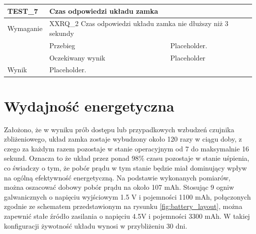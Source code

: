 \begin{table}[h!]
\begin{subtable}[c]{\textwidth}
                \centering
                    \begin{tabular}{|p{2cm}|p{}|p{}|}
                    \hline
                    TEST\_7               & \multicolumn{2}{l|}{\textbf{Czas odpowiedzi układu zamka}}                                                            \\ \hline
                    \cellcolor[gray]{0.8} Wymaganie             & \multicolumn{2}{p{12cm}|}{XXRQ\_2 Czas odpowiedzi układu zamka nie dłuższy niż 3 sekundy }                                                                                    \\ \hline
                    \cellcolor[gray]{0.8} \multirow{2}{*}{Opis} & Przebieg           & Placeholder.  \\ \cline{2-3} 
                    \cellcolor[gray]{0.8}                      & Oczekiwany wynik   & Placeholder                                                 \\ \hline
                    \cellcolor[gray]{0.8} Wynik                 & \multicolumn{2}{p{12cm}|}{Placeholder.}                                                                                  \\ \hline
                    \end{tabular}%
                \label{tbl:test6}
                \vspace{10mm}           
            \end{subtable}
            \label{tbl:tests}
        \end{table}

    \section{Wydajność energetyczna}

        Założono, że w wyniku prób dostępu lub przypadkowych wzbudzeń czujnika zbliżeniowego, układ zamka zostaje wybudzony około 120 razy w ciągu doby, z czego za każdym razem pozostaje w stanie operacyjnym od 7 do maksymalnie 16 sekund. Oznacza to że układ przez ponad 98\% czasu pozostaje w stanie uśpienia, co świadczy o tym, że pobór prądu w tym stanie będzie miał dominujący wpływ na ogólną efektywność energetyczną. Na podstawie wykonanych pomiarów, można oszacować dobowy pobór prądu na około 107 mAh. Stosując 9 ogniw galwanicznych o napięciu wyjściowym 1.5 V i pojemności 1100 mAh, połączonych zgodnie ze schematem przedstawionym na rysunku \ref{fig:battery_layout}, można zapewnić stałe źródło zasilania o napięciu 4.5V i pojemności 3300 mAh. W takiej konfiguracji żywotność układu wynosi w przybliżeniu 30 dni.

